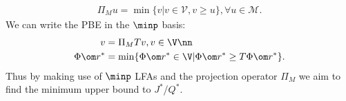 \begin{align}\label{smproj}
\Pi_M u=\min\{ v | {v \in \mathcal{V}}, v \geq u\}, \forall u \in \mathcal{M}.
\end{align}
We can write the PBE in the $\minp$ basis:
\begin{align}\label{projminpbasic}
v&=\Pi_M Tv, v\in \V\nn\\
\Phi \om r^*&=\min\{\Phi \om r^*\in \V|\Phi\om r^*\geq T \Phi \om r^*\}.
\end{align}
Thus by making use of $\minp$ LFAs and the projection operator $\Pi_M$ we aim to find the minimum upper bound to $J^*$/$Q^*$. 
\begin{comment}
\begin{align}\label{alp}
 &\mbox{ }\min ~c^\top \Phi r \\
      &\quad s.t\quad \Phi r(s)\geq g(s,a)+\alpha\sum_{s'}p_a(s,s')(\Phi r)(s'),\forall s \in S, a \in A\nn
\end{align}
\end{comment}
